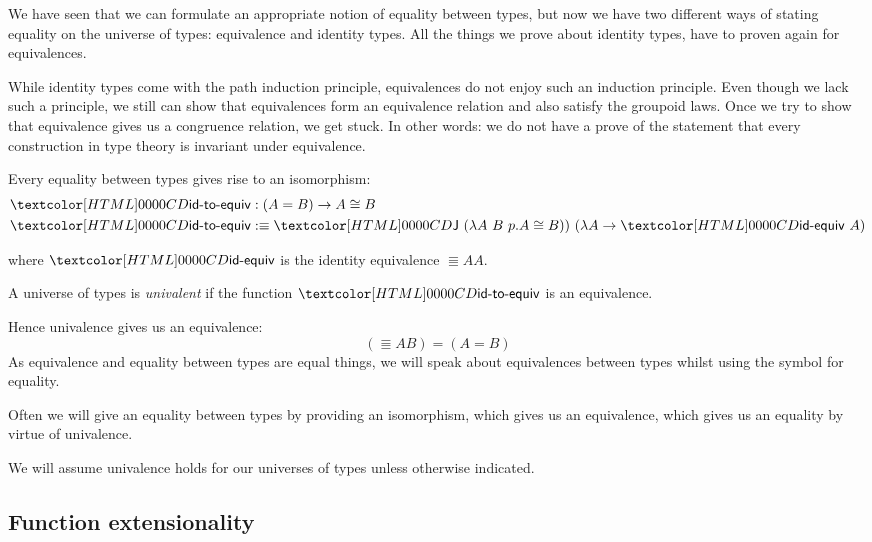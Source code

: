 We have seen that we can formulate an appropriate notion of equality
between types, but now we have two different ways of stating equality
on the universe of types: equivalence and identity types. All the
things we prove about identity types, have to proven again for
equivalences. 

While identity types come with the path induction principle,
equivalences do not enjoy such an induction principle. Even though we
lack such a principle, we still can show that equivalences form an
equivalence relation and also satisfy the groupoid laws. Once we try
to show that equivalence gives us a congruence relation, we get
stuck. In other words: we do not have a prove of the statement that
every construction in type theory is invariant under equivalence.

\begin{definition}
  Every equality between types gives rise to an isomorphism:
  \begin{align*}
    &\idtoequiv : (A = B) \to \Equiv{A}{B} \\
    &\idtoequiv \ddefeq \J\ (\lambda A\ B\ p . \Equiv{A}{B}))\ (\lambda A \to \idequiv\ A)
  \end{align*}

  where $\idequiv$ is the identity equivalence $\Equiv{A}{A}$.
\end{definition}

\begin{definition}[Univalence]
  A universe of types is \emph{univalent} if the function $\idtoequiv$
  is an equivalence.
\end{definition}

Hence univalence gives us an equivalence:
$$
(\Equiv{A}{B}) = (A = B)
$$
As equivalence and equality between types are equal things, we will
speak about equivalences between types whilst using the symbol for
equality.

Often we will give an equality between types by providing an
isomorphism, which gives us an equivalence, which gives us an equality
by virtue of univalence.

We will assume univalence holds for our universes of types unless
otherwise indicated.

\subsection{Function extensionality}

